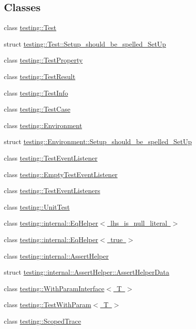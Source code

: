 \subsection*{Classes}
\begin{DoxyCompactItemize}
\item 
class \mbox{\hyperlink{classtesting_1_1_test}{testing\+::\+Test}}
\item 
struct \mbox{\hyperlink{structtesting_1_1_test_1_1_setup__should__be__spelled___set_up}{testing\+::\+Test\+::\+Setup\+\_\+should\+\_\+be\+\_\+spelled\+\_\+\+Set\+Up}}
\item 
class \mbox{\hyperlink{classtesting_1_1_test_property}{testing\+::\+Test\+Property}}
\item 
class \mbox{\hyperlink{classtesting_1_1_test_result}{testing\+::\+Test\+Result}}
\item 
class \mbox{\hyperlink{classtesting_1_1_test_info}{testing\+::\+Test\+Info}}
\item 
class \mbox{\hyperlink{classtesting_1_1_test_case}{testing\+::\+Test\+Case}}
\item 
class \mbox{\hyperlink{classtesting_1_1_environment}{testing\+::\+Environment}}
\item 
struct \mbox{\hyperlink{structtesting_1_1_environment_1_1_setup__should__be__spelled___set_up}{testing\+::\+Environment\+::\+Setup\+\_\+should\+\_\+be\+\_\+spelled\+\_\+\+Set\+Up}}
\item 
class \mbox{\hyperlink{classtesting_1_1_test_event_listener}{testing\+::\+Test\+Event\+Listener}}
\item 
class \mbox{\hyperlink{classtesting_1_1_empty_test_event_listener}{testing\+::\+Empty\+Test\+Event\+Listener}}
\item 
class \mbox{\hyperlink{classtesting_1_1_test_event_listeners}{testing\+::\+Test\+Event\+Listeners}}
\item 
class \mbox{\hyperlink{classtesting_1_1_unit_test}{testing\+::\+Unit\+Test}}
\item 
class \mbox{\hyperlink{classtesting_1_1internal_1_1_eq_helper}{testing\+::internal\+::\+Eq\+Helper$<$ lhs\+\_\+is\+\_\+null\+\_\+literal $>$}}
\item 
class \mbox{\hyperlink{classtesting_1_1internal_1_1_eq_helper_3_01true_01_4}{testing\+::internal\+::\+Eq\+Helper$<$ true $>$}}
\item 
class \mbox{\hyperlink{classtesting_1_1internal_1_1_assert_helper}{testing\+::internal\+::\+Assert\+Helper}}
\item 
struct \mbox{\hyperlink{structtesting_1_1internal_1_1_assert_helper_1_1_assert_helper_data}{testing\+::internal\+::\+Assert\+Helper\+::\+Assert\+Helper\+Data}}
\item 
class \mbox{\hyperlink{classtesting_1_1_with_param_interface}{testing\+::\+With\+Param\+Interface$<$ T $>$}}
\item 
class \mbox{\hyperlink{classtesting_1_1_test_with_param}{testing\+::\+Test\+With\+Param$<$ T $>$}}
\item 
class \mbox{\hyperlink{classtesting_1_1_scoped_trace}{testing\+::\+Scoped\+Trace}}
\end{DoxyCompactItemize}
